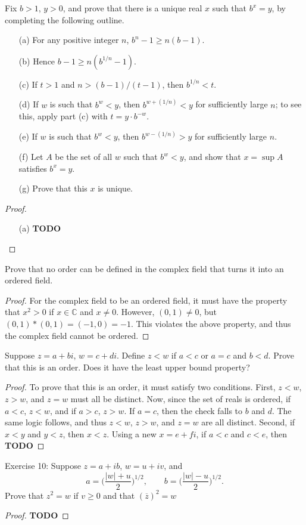 \documentclass[a4paper]{article}
\begin{document}
\begin{ex}[7]
 Fix $b>1$, $y>0$, and prove that there is a unique real $x$ such that $b^x=y$, by completing the following outline.
    \begin{enumerate}
        \item[(a)] For any positive integer $n$, $b^n-1\ge n(b-1)$.
        \item[(b)] Hence $b-1\ge n(b^{1/n}-1)$.
        \item[(c)] If $t>1$ and $n>(b-1)/(t-1)$, then $b^{1/n}<t$.
        \item[(d)] If $w$ is such that $b^w<y$, then $b^{w+(1/n)}<y$ for sufficiently large $n$; to see this, apply part (c) with $t=y\cdot b^{-w}$.
        \item[(e)] If $w$ is such that $b^w<y$, then $b^{w-(1/n)}>y$ for sufficiently large $n$.
        \item[(f)] Let $A$ be the set of all $w$ such that $b^w<y$, and show that $x=\sup A$ satisfies $b^x=y$.
        \item[(g)] Prove that this $x$ is unique.
    \end{enumerate}
\begin{proof}
\begin{enumerate}
    \item[(a)] \textbf{TODO}
\end{enumerate}
\end{proof}
\end{ex}

\begin{ex}[8]
Prove that no order can be defined in the complex field that turns it into an ordered field.
\begin{proof}
For the complex field to be an ordered field, it must have the property that $x^2 > 0$ if $x \in \mathbb{C}$ and $x \neq 0$. However, $(0,1) \neq 0$, but $(0,1) * (0,1) = (-1, 0) = -1$. This violates the above property, and thus the complex field cannot be ordered.
\end{proof}
\end{ex}

\begin{ex}[9]
Suppose $z = a + bi$, $w = c + di$. Define $z < w$ if $a < c$ or $a = c$ and $b < d$. Prove that this is an order. Does it have the least upper bound property?
\begin{proof}
To prove that this is an order, it must satisfy two conditions. First, $z < w$, $z > w$, and $z = w$ must all be distinct. Now, since the set of reals is ordered, if $a < c$, $z < w$, and if $a > c$, $z > w$. If $a = c$, then the check falls to $b$ and $d$. The same logic follows, and thus $z < w$, $z > w$, and $z = w$ are all distinct. Second, if $x < y$ and $y < z$, then $x < z$. Using a new $x = e + fi$, if $a < c$ and $c < e$, then \textbf{TODO}
\end{proof}
\end{ex}

\begin{ex}
Exercise 10: Suppose $z=a+ib$, $w=u+iv$, and $$a=\biggl(\frac{|w|+u}{2}\biggr)^{1/2},\quad\quad b=\biggl(\frac{|w|-u}{2}\biggr)^{1/2}.$$ Prove that $z^2=w$ if $v\ge 0$ and that $(\overline{z})^2=w$
\end{ex}
\begin{proof}
\textbf{TODO}
\end{proof}
\end{document}
